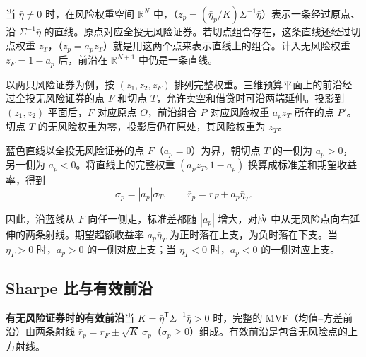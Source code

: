 当 $\bar\eta\ne0$ 时，在风险权重空间 $\mathbb R^N$ 中，（$z_p=(\bar\eta_p/K)\Sigma^{-1}\bar\eta$）表示一条经过原点、沿 $\Sigma^{-1}\bar\eta$ 的直线。原点对应全投无风险证券。若切点组合存在，这条直线还经过切点权重 $z_T$，（$z_p=a_pz_T$）就是用这两个点来表示直线上的组合。计入无风险权重 $z_F=1-a_p$ 后，前沿在 $\mathbb R^{N+1}$ 中仍是一条直线。

 以两只风险证券为例，按 $(z_1,z_2,z_F)$ 排列完整权重。三维预算平面上的前沿经过全投无风险证券的点 $F$ 和切点 $T$，允许卖空和借贷时可沿两端延伸。投影到 $(z_1,z_2)$ 平面后，$F$ 对应原点 $O$，前沿组合 $P$ 对应风险权重 $a_pz_T$ 所在的点 $P'$。切点 $T$ 的无风险权重为零，投影后仍在原处，其风险权重为 $z_T$。

\begin{center}
\begin{minipage}{\linewidth}
\centering
\renewcommand{\thewjFigure}{\thechapter.S\arabic{wjFigure}}%
%
\par
{}
\end{minipage}
\end{center}

蓝色直线以全投无风险证券的点 $F$（$a_p=0$）为界，朝切点 $T$ 的一侧为 $a_p>0$，另一侧为 $a_p<0$。将直线上的完整权重 $(a_pz_T,1-a_p)$ 换算成标准差和期望收益率，得到
\[
 \sigma_p=|a_p|\sigma_T,\qquad \bar r_p=r_F+a_p\bar\eta_T.
\]

因此，沿蓝线从 $F$ 向任一侧走，标准差都随 $|a_p|$ 增大，对应 中从无风险点向右延伸的两条射线。期望超额收益率 $a_p\bar\eta_T$ 为正时落在上支，为负时落在下支。当 $\bar\eta_T>0$ 时，$a_p>0$ 的一侧对应上支；当 $\bar\eta_T<0$ 时，$a_p<0$ 的一侧对应上支。

\subsection{Sharpe 比与有效前沿}
\begin{tcolorbox}[knowledge]
\textbf{有无风险证券时的有效前沿}\quad 当 $K=\bar\eta^{\mathsf T}\Sigma^{-1}\bar\eta>0$ 时，完整的 MVF（均值--方差前沿）由两条射线 $\bar r_p=r_F\pm\sqrt K\,\sigma_p$（$\sigma_p\ge0$）组成。有效前沿是包含无风险点的上方射线。
\end{tcolorbox}

